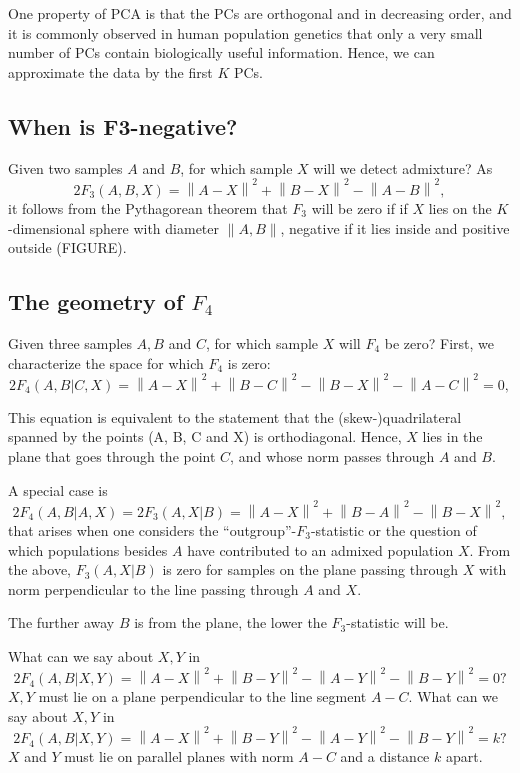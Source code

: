 \documentclass[9pt,twocolumn,twoside,lineno]{pnas-new}
\newcommand{\norm}[1]{\left\lVert #1 \right\rVert}
\newcommand{\nsq}[1]{\left\lVert #1 \right\rVert^2}
\begin{document}
One property of PCA is that the PCs are orthogonal and in decreasing order, and it is commonly observed in human population genetics that only a very small number of PCs contain biologically useful information. Hence, we can approximate the data by the first $K$ PCs. 


\subsection*{When is F3-negative?}
Given two samples $A$ and $B$, for which sample $X$ will we detect admixture?
As 
\begin{equation}
    2 F_3(A, B,X) = \nsq{A-X} + \nsq{B-X} - \nsq{A-B},
\end{equation}
it follows from the Pythagorean theorem that $F_3$ will be zero if  if $X$ lies on the $K$-dimensional sphere with diameter $\norm{A,B}$, negative if it lies inside and positive outside (FIGURE). 

\subsection*{The geometry of $F_4$}
Given three samples $A, B$ and $C$, for which sample $X$ will $F_4$ be zero?
First, we characterize the space for which $F_4$ is zero:
\begin{equation}
    2 F_4(A, B | C, X) = \nsq{A-X} + \nsq{B-C} - \nsq{B-X} - \nsq{A-C} = 0,
\end{equation}

This equation is equivalent to the statement that the (skew-)quadrilateral spanned by the points (A, B, C and X) is orthodiagonal. Hence, $X$ lies in the plane that goes through the point $C$, and whose norm passes through $A$ and $B$. 

A special case is 
\begin{equation}
    2 F_4(A, B | A, X) =2 F_3(A, X | B) = \nsq{A-X} + \nsq{B-A} - \nsq{B-X},
\end{equation}
that arises when one considers the ``outgroup''-$F_3$-statistic or the question of which populations besides $A$ have contributed to an admixed population $X$. From the above, $F_3(A, X|B)$ is zero for samples on the plane passing through $X$ with norm perpendicular to the line passing through $A$ and $X$.

The further away $B$ is from the plane, the lower the $F_3$-statistic will be.

What can we say about $X, Y$ in
\begin{equation}
    2 F_4(A, B | X, Y) = \nsq{A-X} + \nsq{B-Y} - \nsq{A-Y} - \nsq{B-Y} = 0
    \text{?}
\end{equation}
$X, Y$ must lie on a plane perpendicular to the line segment $A-C$. 
What can we say about $X, Y$ in
\begin{equation}
    2 F_4(A, B | X, Y) = \nsq{A-X} + \nsq{B-Y} - \nsq{A-Y} - \nsq{B-Y} = k
    \text{?}
    \end{equation}
$X$ and $Y$ must lie on parallel planes with norm $A-C$ and a distance $k$ apart.
\end{document}
